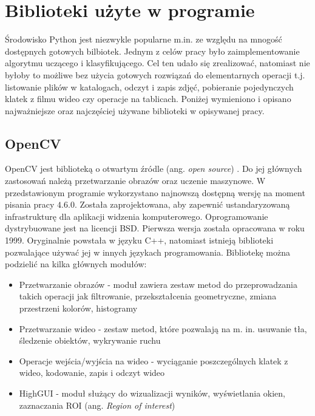 \section{Biblioteki użyte w programie}
Środowisko Python jest niezwykle popularne m.in. ze względu na mnogość dostępnych gotowych bilbiotek.
Jednym z celów pracy było zaimplementowanie algorytmu uczącego i klasyfikującego.
Cel ten udało się zrealizować, natomiast nie byłoby to możliwe bez użycia gotowych rozwiązań do elementarnych operacji t.j. listowanie plików w katalogach, odczyt i zapis zdjęć, pobieranie pojedynczych klatek z filmu wideo czy operacje na tablicach.
Poniżej wymieniono i opisano najważniejsze oraz najczęściej używane biblioteki w opisywanej pracy.

\subsection{OpenCV}
OpenCV jest biblioteką o otwartym źródle (ang. \textit{open source}) \cite{open_cv,open_cv_docs} .
Do jej głównych zastosowań należą przetwarzanie obrazów oraz uczenie maszynowe.
W przedstawionym programie wykorzystano najnowszą dostępną wersję na moment pisania pracy $4.6.0$.
Została zaprojektowana, aby zapewnić ustandaryzowaną infrastrukturę dla aplikacji widzenia komputerowego.
Oprogramowanie dystrybuowane jest na licencji BSD.
Pierwsza wersja została opracowana w roku 1999.
Oryginalnie powstała w języku C++, natomiast istnieją biblioteki pozwalające używać jej w innych językach programowania.
Bibliotekę można podzielić na kilka głównych modułów:
\begin{itemize}
    \item Przetwarzanie obrazów - moduł zawiera zestaw metod do przeprowadzania takich operacji jak filtrowanie, przekształcenia geometryczne, zmiana przestrzeni kolorów, histogramy
    \item Przetwarzanie wideo - zestaw metod, które pozwalają na m. in. usuwanie tła, śledzenie obiektów, wykrywanie ruchu
    \item Operacje wejścia/wyjścia na wideo - wyciąganie poszczególnych klatek z wideo, kodowanie, zapis i odczyt wideo
    \item HighGUI - moduł służący do wizualizacji wyników, wyświetlania okien, zaznaczania ROI (ang. \textit{Region of interest})
\end{itemize}

